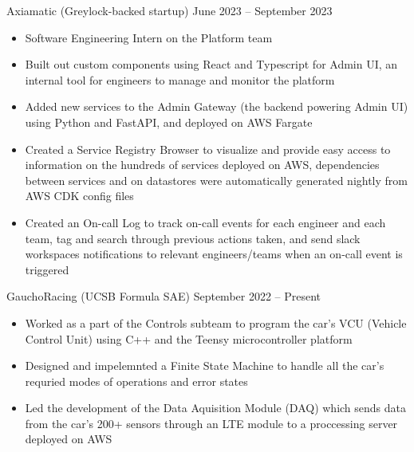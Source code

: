 \documentclass[9pt]{developercv} %
\begin{document}
\vspace{-18 pt}
\vspace{-4 pt}
\begin{entrylist}
    \vspace{-4 pt}
	\entry
        {}
		{Axiamatic (Greylock-backed startup)}
		{June 2023 – September 2023}
		{\vspace{-10pt}
        \begin{itemize}[noitemsep,topsep=0pt,parsep=0pt,partopsep=0pt, leftmargin=10pt]
            \item Software Engineering Intern on the Platform team
            \item Built out custom components using React and Typescript for Admin UI, an internal tool for engineers to manage and monitor the platform
            \item Added new services to the Admin Gateway (the backend powering Admin UI) using Python and FastAPI, and deployed on AWS Fargate
            \item Created a Service Registry Browser to visualize and provide easy access to information on the hundreds of services deployed on AWS, dependencies between services and on datastores were automatically generated nightly from AWS CDK config files
            \item Created an On-call Log to track on-call events for each engineer and each team, tag and search through previous actions taken, and send slack workspaces notifications to relevant engineers/teams when an on-call event is triggered
        \end{itemize}}
    \vspace{-4 pt}
    \entry
		{}
		{GauchoRacing (UCSB Formula SAE)}
		{September 2022 – Present}
		{\vspace{-10pt}
        \begin{itemize}[noitemsep,topsep=0pt,parsep=0pt,partopsep=0pt, leftmargin=10pt]
            \item Worked as a part of the Controls subteam to program the car's VCU (Vehicle Control Unit) using C++ and the Teensy microcontroller platform
            \item Designed and impelemnted a Finite State Machine to handle all the car's requried modes of operations and error states
            \item Led the development of the Data Aquisition Module (DAQ) which sends data from the car's 200+ sensors through an LTE module to a proccessing server deployed on AWS

\end{itemize}}
\end{entrylist}
\end{document}
